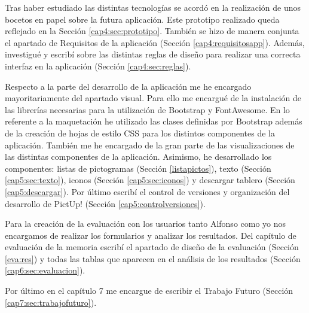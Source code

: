 Tras haber estudiado las distintas tecnologías se acordó en la realización de unos bocetos en papel sobre la futura aplicación. Este prototipo realizado queda reflejado en la Sección \ref{cap4:sec:prototipo}. También se hizo de manera conjunta el apartado de Requisitos de la aplicación (Sección \ref{cap4:requisitosapp}). Además, investigué y escribí sobre las distintas reglas de diseño para realizar una correcta interfaz en la aplicación (Sección \ref{cap4:sec:reglas}).


Respecto a la parte del desarrollo de la aplicación me he encargado mayoritariamente del apartado visual. Para ello me encargué de la instalación de las librerías necesarias para la utilización de Bootstrap y FontAwesome. En lo referente a la maquetación he utilizado las clases definidas por Bootstrap además de la creación de hojas de estilo CSS para los distintos componentes de la aplicación. También me he encargado de la gran parte de las visualizaciones de las distintas componentes de la aplicación. Asimismo, he desarrollado los componentes: listas de pictogramas (Sección \ref{listapictos}), texto (Sección \ref{cap5:sec:texto}), iconos (Sección \ref{cap5:sec:iconos}) y descargar tablero (Sección \ref{cap5:descargar}). Por último escribí el control de versiones y organización del desarrollo de PictUp! (Sección \ref{cap5:controlversiones}).


Para la creación de la evaluación con los usuarios tanto Alfonso como yo nos encargamos de realizar los formularios y analizar los resultados. Del capítulo de evaluación de la memoria escribí el apartado de diseño de la evaluación (Sección \ref{eva:res}) y todas las tablas que aparecen en el análisis de los resultados (Sección \ref{cap6:sec:evaluacion}).


Por último en el capítulo 7 me encargue de escribir el Trabajo Futuro (Sección \ref{cap7:sec:trabajofuturo}).













